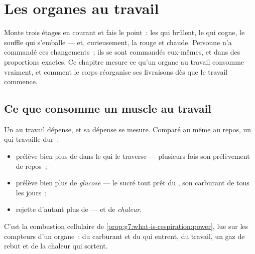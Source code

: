 \chapter{Les organes au travail}\label{ch:g7:organs-at-work}

Monte trois étages en courant et fais le point~: les  qui
brûlent, le  qui cogne, le souffle qui s'emballe --- et,
curieusement, la  rouge et chaude. Personne n'a commandé ces
changements~; ils se sont commandés eux-mêmes, et dans des
proportions exactes. Ce chapitre mesure ce qu'un organe au travail
consomme vraiment, et comment le corps réorganise ses livraisons dès
que le travail commence.

\section{Ce que consomme un muscle au travail}

\begin{proposition}\label{prop:g7:organs-at-work:bill}
Un  au travail dépense, et sa dépense se mesure. Comparé au
même  au repos, un  qui travaille dur~:
\begin{itemize}
  \item prélève bien plus de \emph{} dans le  qui le
        traverse --- plusieurs fois son prélèvement de repos~;
  \item prélève bien plus de \emph{glucose} --- le
         sucré tout prêt du , son carburant de tous
        les jours~;
  \item rejette d'autant plus de \emph{} --- et
        de \emph{chaleur}.
\end{itemize}
C'est la combustion cellulaire de
\cref{prop:g7:what-is-respiration:power}, lue sur les compteurs d'un
organe~: du carburant et du  qui entrent, du travail, un
gaz de rebut et de la chaleur qui sortent.
\end{proposition}
\admitted

